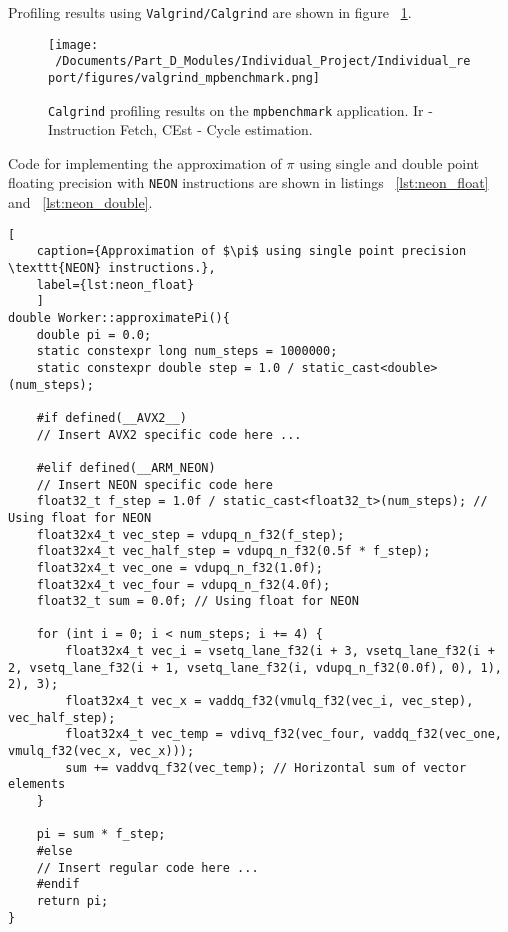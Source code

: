 Profiling results using \texttt{Valgrind/Calgrind} are shown in figure ~\ref{fig:mpbenchmark_profiled}.

\begin{figure}[H] %
	\centering
	\texttt{[image: ~/Documents/Part\_D\_Modules/Individual\_Project/Individual\_report/figures/valgrind\_mpbenchmark.png]} %
	\caption{\texttt{Calgrind} profiling results on the \texttt{mpbenchmark} application. Ir - Instruction Fetch, CEst - Cycle estimation.}
	\label{fig:mpbenchmark_profiled} %
\end{figure} 

Code for implementing the approximation of $\pi$ using single and double point floating precision with \texttt{NEON} instructions are shown in listings ~\ref{lst:neon_float} and ~\ref{lst:neon_double}.

\begin{lstlisting}[
	caption={Approximation of $\pi$ using single point precision \texttt{NEON} instructions.},
	label={lst:neon_float}
	]
double Worker::approximatePi(){
	double pi = 0.0;
	static constexpr long num_steps = 1000000;
	static constexpr double step = 1.0 / static_cast<double>(num_steps);
	
	#if defined(__AVX2__)
	// Insert AVX2 specific code here ...

	#elif defined(__ARM_NEON)
	// Insert NEON specific code here
	float32_t f_step = 1.0f / static_cast<float32_t>(num_steps); // Using float for NEON
	float32x4_t vec_step = vdupq_n_f32(f_step);
	float32x4_t vec_half_step = vdupq_n_f32(0.5f * f_step);
	float32x4_t vec_one = vdupq_n_f32(1.0f);
	float32x4_t vec_four = vdupq_n_f32(4.0f);
	float32_t sum = 0.0f; // Using float for NEON
	
	for (int i = 0; i < num_steps; i += 4) {
		float32x4_t vec_i = vsetq_lane_f32(i + 3, vsetq_lane_f32(i + 2, vsetq_lane_f32(i + 1, vsetq_lane_f32(i, vdupq_n_f32(0.0f), 0), 1), 2), 3);
		float32x4_t vec_x = vaddq_f32(vmulq_f32(vec_i, vec_step), vec_half_step);
		float32x4_t vec_temp = vdivq_f32(vec_four, vaddq_f32(vec_one, vmulq_f32(vec_x, vec_x)));
		sum += vaddvq_f32(vec_temp); // Horizontal sum of vector elements
	}
	
	pi = sum * f_step;
	#else
	// Insert regular code here ...
	#endif
	return pi;
}
\end{lstlisting}


